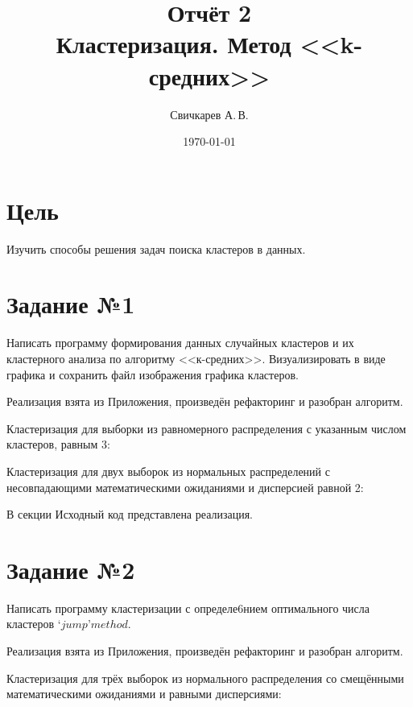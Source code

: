 \documentclass{article} %
\title{Отчёт 2\protect\\Кластеризация. Метод <<k-средних>>} %
\author{Свичкарев А.\,В.} %
\date{\today} %
\begin{document}

\maketitle %

\section{Цель}
Изучить способы решения задач поиска кластеров в данных.

\section{Задание №1}
Написать программу формирования данных случайных кластеров и их кластерного
анализа по алгоритму <<к-средних>>. Визуализировать в виде графика и сохранить файл
изображения графика кластеров.

Реализация взята из Приложения, произведён рефакторинг и разобран алгоритм.

\clearpage

Кластеризация для выборки из
равномерного распределения
с указанным числом кластеров, равным 3:

\noindent{}

\clearpage

Кластеризация для двух выборок
из нормальных распределений
с несовпадающими математическими ожиданиями
и дисперсией равной 2:

\noindent{}

В секции Исходный код представлена реализация.

\section{Задание №2}

Написать программу кластеризации с определе6нием оптимального числа кластеров \(‘jump’ method\).

Реализация взята из Приложения, произведён рефакторинг и разобран алгоритм.

\clearpage

Кластеризация для трёх выборок
из нормального распределения
со смещёнными математическими ожиданиями
и равными дисперсиями:

\noindent{}
\end{document}
